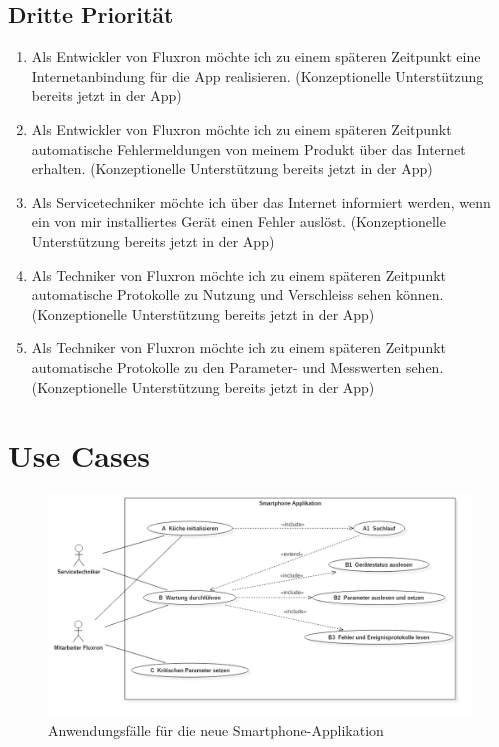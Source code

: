 \subsection{Dritte Priorität}
\label{subsec:Dritte Priorität}

\begin{enumerate}[resume]
\item Als Entwickler von Fluxron möchte ich zu einem späteren Zeitpunkt eine Internetanbindung für die App realisieren. (Konzeptionelle Unterstützung bereits jetzt in der App)
\item Als Entwickler von Fluxron möchte ich zu einem späteren Zeitpunkt automatische Fehlermeldungen von meinem Produkt über das Internet erhalten. (Konzeptionelle Unterstützung bereits jetzt in der App)
\item Als Servicetechniker möchte ich über das Internet informiert werden, wenn ein von mir installiertes Gerät einen Fehler auslöst. (Konzeptionelle Unterstützung bereits jetzt in der App)
\item Als Techniker von Fluxron möchte ich zu einem späteren Zeitpunkt automatische Protokolle zu Nutzung und Verschleiss sehen können. (Konzeptionelle Unterstützung bereits jetzt in der App)
\item Als Techniker von Fluxron möchte ich zu einem späteren Zeitpunkt automatische Protokolle zu den Parameter- und Messwerten sehen. (Konzeptionelle Unterstützung bereits jetzt in der App)
\end{enumerate}

\section{Use Cases}
\label{sec:Use Cases}

\begin{figure}[H]
	\includegraphics[scale=0.4]{analysis/res/UseCases}
	\caption{Anwendungsfälle für die neue Smartphone-Applikation}
\end{figure}

